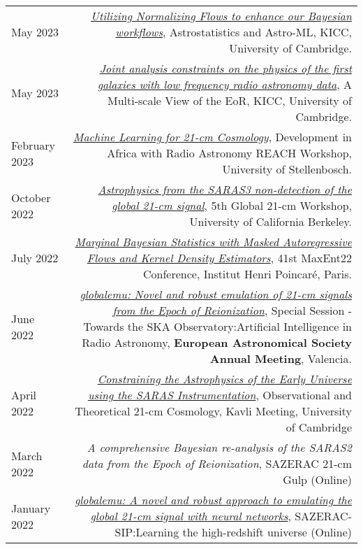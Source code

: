 \documentclass{article}
\begin{document}
\begin{tabular}{L!{\vrule}R}
    May 2023 & \href{https://github.com/htjb/Talks/blob/master/Talks/KICC_EoR/Bevins_KICC_EoR.pdf}{\textit{Utilizing Normalizing Flows to enhance our Bayesian workflows}}, Astrostatistics and Astro-ML, KICC, University of Cambridge. \\
    May 2023 & \href{https://github.com/htjb/Talks/blob/master/Talks/KICC_EoR/Bevins_KICC_EoR.pdf}{\textit{Joint analysis constraints on the physics of the first galaxies with low frequency radio astronomy data}}, A Multi-scale View of the EoR, KICC, University of Cambridge. \\
    February 2023 & \href{https://github.com/htjb/Talks/blob/master/Talks/DARA_REACH_Workshop/DARA_Workshop.pdf}{\textit{Machine Learning for 21-cm Cosmology}}, Development in Africa with Radio Astronomy REACH Workshop, University of Stellenbosch. \\
    October 2022 & \href{https://global21cmworkshop.org/2022-berkeley/}{\textit{Astrophysics from the SARAS3 non-detection of the global 21-cm signal}}, 5th Global 21-cm Workshop, University of California Berkeley. \\
	July 2022 & \href{https://github.com/htjb/Talks/blob/master/Talks/MaxEnt22_margarine_June_2022/MaxEnt_slides.pdf}{\textit{Marginal Bayesian Statistics with Masked Autoregressive Flows and Kernel Density Estimators}}, 41st MaxEnt22 Conference, Institut Henri Poincar\'e, Paris. \\
	June 2022 & \href{https://github.com/htjb/Talks/blob/master/Talks/ESA_globalemu_July_2022/AUDITORIUM\%203A_SS23a_0940_Bevins.pdf}{\textit{globalemu: Novel and robust emulation of 21-cm signals from the Epoch of Reionization}}, Special Session - Towards the SKA Observatory:Artificial Intelligence in Radio Astronomy, \textbf{European Astronomical Society Annual Meeting}, Valencia. \\
	April 2022 & \href{https://www.kicc.cam.ac.uk/events/kavli-science-themed-meetings/observational-and-theoretical-21-cm-cosmology}{\textit{Constraining the Astrophysics of the Early Universe using the SARAS Instrumentation}}, Observational and Theoretical 21-cm Cosmology, Kavli Meeting, University of Cambridge \\
	March 2022 & \textit{A comprehensive Bayesian re-analysis of the SARAS2 data from the Epoch of Reionization}, SAZERAC 21-cm Gulp (Online) \\
	January 2022 & \href{https://www.youtube.com/watch?v=BFwia93NuAc&list=PLp95u5tgS_YUkFaLATBQpLajJzO5ljN5u&index=5}{\textit{globalemu: A novel and robust approach to emulating the global 21-cm signal with neural networks}}, SAZERAC-SIP:Learning the high-redshift universe (Online) \\

\end{tabular}
\end{document}
